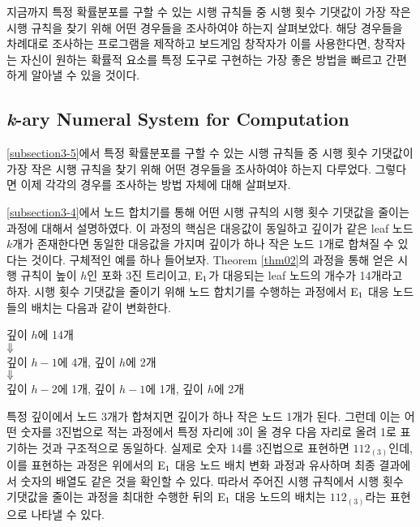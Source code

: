 \documentclass[11pt]{article}
\begin{document}
지금까지 특정 확률분포를 구할 수 있는 시행 규칙들 중 시행 횟수 기댓값이 가장 작은 시행 규칙을 찾기 위해 어떤 경우들을 조사하여야 하는지 살펴보았다. 해당 경우들을 차례대로 조사하는 프로그램을 제작하고 보드게임 창작자가 이를 사용한다면, 창작자는 자신이 원하는 확률적 요소를 특정 도구로 구현하는 가장 좋은 방법을 빠르고 간편하게 알아낼 수 있을 것이다.

\subsection{\textit{k}-ary Numeral System for Computation}
\ref{subsection3-5}에서 특정 확률분포를 구할 수 있는 시행 규칙들 중 시행 횟수 기댓값이 가장 작은 시행 규칙을 찾기 위해 어떤 경우들을 조사하여야 하는지 다루었다. 그렇다면 이제 각각의 경우를 조사하는 방법 자체에 대해 살펴보자.

\ref{subsection3-4}에서 노드 합치기를 통해 어떤 시행 규칙의 시행 횟수 기댓값을 줄이는 과정에 대해서 설명하였다. 이 과정의 핵심은 대응값이 동일하고 깊이가 같은 leaf 노드 $k$개가 존재한다면 동일한 대응값을 가지며 깊이가 하나 작은 노드 1개로 합쳐질 수 있다는 것이다. 구체적인 예를 하나 들어보자. Theorem \ref{thm02}의 과정을 통해 얻은 시행 규칙이 높이 $h$인 포화 3진 트리이고, $\textnormal{E}_{1}$가 대응되는 leaf 노드의 개수가 14개라고 하자. 시행 횟수 기댓값을 줄이기 위해 노드 합치기를 수행하는 과정에서 $\textnormal{E}_{1}$ 대응 노드들의 배치는 다음과 같이 변화한다.

\begin{center}
깊이 $h$에 14개\\
$\Large \Downarrow$ \\
깊이 $h-1$에 4개, 깊이 $h$에 2개\\
$\Large \Downarrow$ \\
깊이 $h-2$에 1개, 깊이 $h-1$에 1개, 깊이 $h$에 2개
\end{center}
\doublespacing

특정 깊이에서 노드 3개가 합쳐지면 깊이가 하나 작은 노드 1개가 된다. 그런데 이는 어떤 숫자를 3진법으로 적는 과정에서 특정 자리에 3이 올 경우 다음 자리로 올려 1로 표기하는 것과 구조적으로 동일하다. 실제로 숫자 14를 3진법으로 표현하면 $112_{(3)}$인데, 이를 표현하는 과정은 위에서의 $\textnormal{E}_{1}$ 대응 노드 배치 변화 과정과 유사하며 최종 결과에서 숫자의 배열도 같은 것을 확인할 수 있다. 따라서 주어진 시행 규칙에서 시행 횟수 기댓값을 줄이는 과정을 최대한 수행한 뒤의 $\textnormal{E}_{1}$ 대응 노드의 배치는 $112_{(3)}$라는 표현으로 나타낼 수 있다.
\end{document}
